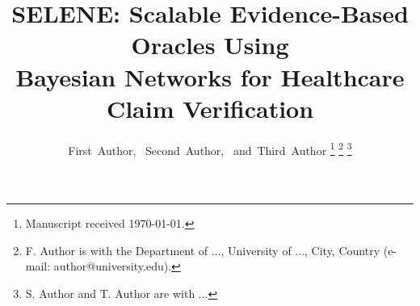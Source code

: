 \documentclass[journal]{IEEEtran}
\begin{document}
\title{SELENE: Scalable Evidence-Based Oracles Using\\
       Bayesian Networks for Healthcare Claim Verification}

\author{First~Author,~
        Second~Author,~
        and~Third~Author%
\thanks{Manuscript received \today.}%
\thanks{F. Author is with the Department of ...,
        University of ..., City, Country
        (e-mail: author@university.edu).}%
\thanks{S. Author and T. Author are with ...}}

\maketitle
\end{document}
